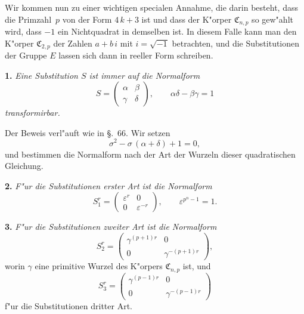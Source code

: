 \documentclass[12pt,a4paper]{article}
\theoremstyle{plain}
\theoremstyle{definition}
\theoremstyle{remark}
\begin{document}
Wir kommen nun zu einer wichtigen specialen Annahme, die darin besteht, dass die Primzahl~$p$ von der Form $4\,k + 3$ ist und dass der K"orper $\mathfrak{C}_{n,p}$ so gew"ahlt wird, dass $-1$ ein Nichtquadrat in demselben ist. In diesem Falle kann man den K"orper $\mathfrak{C}_{2,p}$ der Zahlen $a + b\,i$ mit $i = \sqrt{-1}$ betrachten, und die Substitutionen der Gruppe $E$ lassen sich dann in reeller Form schreiben.

\medskip\noindent\textbf{1.} \emph{Eine Substitution $S$ ist immer auf die Normalform}
\begin{equation}\tag{1}
S = \begin{pmatrix} \alpha & \beta \\ \gamma & \delta \end{pmatrix},\qquad \alpha\delta - \beta\gamma = 1
\end{equation}
\emph{transformirbar.}

Der Beweis verl"auft wie in \S.~66. Wir setzen
\begin{equation}\tag{2}
\sigma^{2} - \sigma\,(\alpha + \delta) + 1 = 0,
\end{equation}
und bestimmen die Normalform nach der Art der Wurzeln dieser quadratischen Gleichung.

\medskip\noindent\textbf{2.} \emph{F"ur die Substitutionen erster Art ist die Normalform}
\begin{equation}\tag{3}
S_{1}^{r} = \begin{pmatrix} \varepsilon^{r} & 0 \\ 0 & \varepsilon^{-r} \end{pmatrix},\qquad \varepsilon^{p^{n}-1} = 1.
\end{equation}

\medskip\noindent\textbf{3.} \emph{F"ur die Substitutionen zweiter Art ist die Normalform}
\begin{equation}\tag{4}
S_{2}^{r} = \begin{pmatrix} \gamma^{(p+1)r} & 0 \\ 0 & \gamma^{-(p+1)r} \end{pmatrix},
\end{equation}
worin $\gamma$ eine primitive Wurzel des K"orpers $\mathfrak{C}_{n,p}$ ist, und
\begin{equation}\tag{5}
S_{3}^{r} = \begin{pmatrix} \gamma^{(p-1)r} & 0 \\ 0 & \gamma^{-(p-1)r} \end{pmatrix}
\end{equation}
f"ur die Substitutionen dritter Art.
\end{document}
